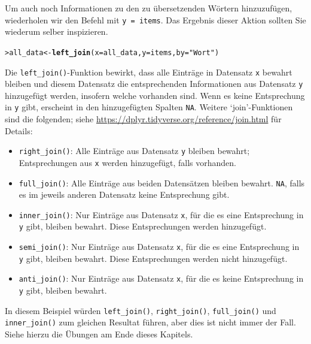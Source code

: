 \documentclass[oneside, 10pt]{book}\usepackage[]{graphicx}\usepackage[]{xcolor}
\makeatletter
\newcommand{\hlstr}[1]{\textcolor[rgb]{0.192,0.494,0.8}{#1}}%
\newcommand{\hlstd}[1]{\textcolor[rgb]{0.345,0.345,0.345}{#1}}%
\newcommand{\hlkwb}[1]{\textcolor[rgb]{0.69,0.353,0.396}{#1}}%
\newcommand{\hlkwc}[1]{\textcolor[rgb]{0.333,0.667,0.333}{#1}}%
\newcommand{\hlkwd}[1]{\textcolor[rgb]{0.737,0.353,0.396}{\textbf{#1}}}%
\newenvironment{kframe}{%
 \def\at@end@of@kframe{}%
 \ifinner\ifhmode%
  \def\at@end@of@kframe{\end{minipage}}%
  \begin{minipage}{\columnwidth}%
 \fi\fi%
 \def\FrameCommand##1{\hskip\@totalleftmargin \hskip-\fboxsep
 \colorbox{shadecolor}{##1}\hskip-\fboxsep
     \hskip-\linewidth \hskip-\@totalleftmargin \hskip\columnwidth}%
 \MakeFramed {\advance\hsize-\width
   \@totalleftmargin\z@ \linewidth\hsize
   \@setminipage}}%
 {\par\unskip\endMakeFramed%
 \at@end@of@kframe}
\newenvironment{knitrout}{}{} %
\makeatother
\begin{document}
Um auch noch Informationen zu den zu übersetzenden Wörtern
hinzuzufügen, wiederholen wir den Befehl mit \texttt{y = items}.
Das Ergebnis dieser Aktion sollten Sie wiederum selber inspizieren.
\begin{knitrout}
\color{fgcolor}\begin{kframe}
\begin{alltt}
\hlstd{> }\hlstd{all_data} \hlkwb{<-} \hlkwd{left_join}\hlstd{(}\hlkwc{x} \hlstd{= all_data,} \hlkwc{y} \hlstd{= items,} \hlkwc{by} \hlstd{=} \hlstr{"Wort"}\hlstd{)}
\end{alltt}
\end{kframe}
\end{knitrout}

Die \texttt{left\_join()}-Funktion bewirkt, dass alle Einträge
in Datensatz \texttt{x} bewahrt bleiben und diesem Datensatz die entsprechenden
Informationen aus Datensatz \texttt{y} hinzugefügt werden, insofern welche vorhanden sind.
Wenn es keine Entsprechung in \texttt{y} gibt, erscheint in den hinzugefügten Spalten \texttt{NA}.
Weitere `join'-Funktionen sind die folgenden; siehe \url{https://dplyr.tidyverse.org/reference/join.html} für Details:

\begin{itemize}
 \item \texttt{right\_join()}: Alle Einträge aus Datensatz \texttt{y} bleiben bewahrt; Entsprechungen aus \texttt{x} werden hinzugefügt, falls vorhanden.
 \item \texttt{full\_join()}: Alle Einträge aus beiden Datensätzen bleiben bewahrt. \texttt{NA}, falls es im jeweils anderen Datensatz keine Entsprechung gibt.
 \item \texttt{inner\_join()}: Nur Einträge aus Datensatz \texttt{x}, für die es eine Entsprechung in \texttt{y} gibt, bleiben bewahrt. Diese Entsprechungen werden hinzugefügt.
 \item \texttt{semi\_join()}: Nur Einträge aus Datensatz \texttt{x}, für die es eine Entsprechung in \texttt{y} gibt, bleiben bewahrt. Diese Entsprechungen werden nicht hinzugefügt.
 \item \texttt{anti\_join()}: Nur Einträge aus Datensatz \texttt{x}, für die es keine Entsprechung in \texttt{y} gibt, bleiben bewahrt.
\end{itemize}

In diesem Beispiel würden \texttt{left\_join()}, \texttt{right\_join()}, \texttt{full\_join()}
und \texttt{inner\_join()} zum gleichen Resultat führen, aber dies ist nicht immer der Fall. Siehe hierzu die Übungen am Ende dieses Kapitels.
\end{document}
